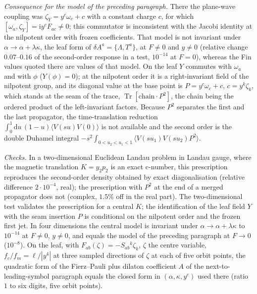 \emph{Consequence for the model of the preceding paragraph.} There the plane-wave coupling was \(\zeta_Y=y^c\omega_c+c\) with a constant charge \(c\), for which \([\omega_a,\zeta_Y]=\mathrm iy^cF_{ac}\ne0\); this commutator is inconsistent with the Jacobi identity at the nilpotent order with frozen coefficients. That model is not invariant under \(\alpha\to\alpha+\lambda\kappa\), the leaf form of \(\delta A^a=\{\Lambda,T^a\}\), at \(F\ne0\) and \(y\ne0\) (relative change \(0.07\)--\(0.16\) of the second-order response in a test, \(10^{-14}\) at \(F=0\)), whereas the Fin values quoted there are values of that model. On the leaf \(Y\) commutes with \(\omega_a\) and with \(\phi\) (\(Y(\phi)=0\)); at the nilpotent order it is a right-invariant field of the nilpotent group, and its diagonal value at the base point is \(P=y^c\omega_c+c\), \(c=y^k\zeta_k\), which stands at the seam of the trace, \(\operatorname{Tr}[\text{chain}\cdot P^2]\), the chain being the ordered product of the left-invariant factors. Because \(P^2\) separates the first and the last propagator, the time-translation reduction \(\int_0^1\mathrm du\,(1-u)\langle V(su)V(0)\rangle\) is not available and the second order is the double Duhamel integral \(-s^2\int_{0<u_2<u_1<1}\langle V(su_1)V(su_2)P^2\rangle\).

\emph{Checks.} In a two-dimensional Euclidean Landau problem in Landau gauge, where the magnetic translation \(K=y_2p_2\) is an exact c-number, this prescription reproduces the second-order density obtained by exact diagonalisation (relative difference \(2\cdot10^{-4}\), real); the prescription with \(P^2\) at the end of a merged propagator does not (complex, \(1.5\%\) off in the real part). The two-dimensional test validates the prescription for a central \(K\); the identification of the leaf field \(Y\) with the seam insertion \(P\) is conditional on the nilpotent order and the frozen first jet. In four dimensions the central model is invariant under \(\alpha\to\alpha+\lambda\kappa\) to \(10^{-14}\) at \(F\ne0\), \(y\ne0\), and equals the model of the preceding paragraph at \(F\to0\) (\(10^{-8}\)). On the leaf, with \(F_{ab}(\zeta)=-S_{ab}{}^k\zeta_k\), \(\zeta\) the centre variable, \(f_e/f_m=\ell/|y^4|\) at three sampled directions of \(\zeta\) at each of five orbit points, the quadratic form of the Fierz--Pauli plus dilaton coefficient \(A\) of the next-to-leading-symbol paragraph equals the closed form in \((\alpha,\kappa,y^c)\) used there (ratio \(1\) to six digits, five orbit points).

